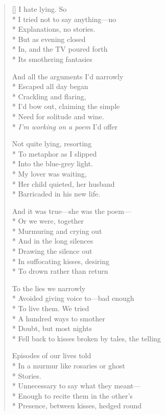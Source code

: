 \begin{verse}[\versewidth]
I hate lying. So\\*
I tried not to say anything---no\\*
Explanations, no stories. \\*
But as evening closed\\*
In, and the TV poured forth\\*
Its smothering fantasies

And all the arguments I'd narrowly\\*
Escaped all day began\\*
Crackling and flaring,\\*
I'd bow out, claiming the simple\\*
Need for solitude and wine.\\*
\textit{I'm working on a poem} I'd offer

Not quite lying, resorting\\*
To metaphor as I slipped\\*
Into the blue-grey light.\\*
My lover was waiting, \\*
Her child quieted, her husband\\*
Barricaded in his new life.

And it was true---she was the poem---\\*
Or we were, together\\*
Murmuring and crying out\\*
And in the long silences\\*
Drawing the silence out\\*
In suffocating kisses, desiring\\*
To drown rather than return


To the lies we narrowly\\*
Avoided giving voice to---bad enough\\*
To live them. We tried\\*
A hundred ways to smother\\*
Doubt, but most nights\\*
Fell back to kisses broken by tales, the telling

Episodes of our lives told\\*
In a murmur like rosaries or ghost\\*
Stories. \\*
 Unnecessary to say what they meant---\\*
Enough to recite them in the other's\\*
Presence, between kisses, hedged round


\end{verse}
